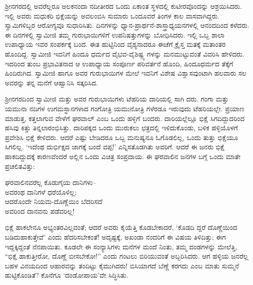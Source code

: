 ಶ್ರೀನಗರದಲ್ಲಿ ಅವರೆಲ್ಲರೂ ಅಲಕನಂದಾ ನದೀತೀರದ ಒಂದು ಏಕಾಂತ ಸ್ಥಳದಲ್ಲಿ ಕುಟೀರವೊಂದನ್ನು ಆಶ್ರಯಿಸಿದರು. ಇಲ್ಲಿ ಅವರು ಮಧುಕರಿ ಭಿಕ್ಷೆಯನ್ನು ಅವಲಂಬಿಸಿ ಸುಮಾರು ಒಂದೂವರೆ ತಿಂಗಳ ಕಾಲ ವಾಸವಾಗಿದ್ದರು. ಸ್ವಾಮಿಗಳಿಬ್ಬರ ಆರೋಗ್ಯವೂ ಸುಧಾರಿಸಿತು. ದಿನಗಳನ್ನು ಧ್ಯಾನ-ಪ್ರಾರ್ಥನೆ-ಶಾಸ್ತ್ರಾಧ್ಯಯನಗಳಲ್ಲಿ ಆನಂದದಿಂದ ಕಳೆದರು. ಈ ದಿನಗಳಲ್ಲಿ ಸ್ವಾಮೀಜಿ ತಮ್ಮ ಗುರುಭಾಯಿಗಳಿಗೆ ಉಪನಿಷತ್ತುಗಳನ್ನು ಬೋಧಿಸಿದರು. ಇಲ್ಲಿ ಒಬ್ಬ ಶಾಲಾ ಉಪಾಧ್ಯಾಯ ಇವರ ಸಂಪರ್ಕಕ್ಕೆ ಬಂದ. ಈತ ಹುಟ್ಟಿನಿಂದ ವೈಶ್ಯನಾದರೂ ಈಚೆಗೆ ಕ್ರೈಸ್ತ ಮತಕ್ಕೆ ಮತಾಂತರ ಹೊಂದಿದ್ದ. ಸ್ವಾಮೀಜಿ ಇವನಿಗೆ ಹಿಂದೂ ಧರ್ಮದ ವೈಭವ-ವೈಶಿಷ್ಟ್ಯ ಗಳನ್ನು ಮನಮುಟ್ಟುವಂತೆ ವಿವರಿಸಿ ಹೇಳಿದರು. ಇದರಿಂದ ತುಂಬ ಪ್ರಭಾವಿತನಾದ ಆ ಉಪಾಧ್ಯಾಯ ಸಂಪೂರ್ಣ ಪರಿವರ್ತನೆ ಹೊಂದಿ, ಹಿಂದೂಧರ್ಮದ ತೆಕ್ಕೆಗೆ ಹಿಂದಿರುಗಿದ. ಸ್ವಾಮೀಜಿ ಹಾಗೂ ಅವರ ಗುರುಭಾಯಿಗಳ ಮೇಲೆ ಇವನಿಗೆ ವಿಶೇಷ ವಿಶ್ವಾಸವುಂಟಾಗಿ ಹಲವಾರು ಸಲ ಅವರನ್ನು ತನ್ನ ಮನೆಗೆ ಆಹ್ವಾನಿಸಿ ಸತ್ಕರಿಸಿದ.

ಶ್ರೀನಗರದಿಂದ ಸ್ವಾಮೀಜಿ ಮತ್ತು ಅವರ ಗುರುಭಾಯಿಗಳು ಟೆಹರಿಯ ದಾರಿಯಲ್ಲಿ ಸಾಗಿ ದರು. ಗಂಗಾ ಮತ್ತು ಯಮುನಾ ನದಿಗಳ ಉಗಮಸ್ಥಾನಗಳಾದ ಗಂಗೋತ್ರಿ ಯಮುನೋತ್ರಿ ಗಳೆರಡೂ ಇರುವುದು ಟೆಹರಿಯಲ್ಲೇ. ಪ್ರಯಾಣ ಮಾಡುತ್ತ, ಕತ್ತಲಾಗುವ ವೇಳೆಗೆ ಘರವಾಲ್ ಎಂಬ ಒಂದು ಹಳ್ಳಿಗೆ ಬಂದರು. ದಾರಿಯಲ್ಲೆಲ್ಲೂ ಭಿಕ್ಷೆ ಸಿಗದಿದ್ದುದರಿಂದ ಹಸಿವು ಕಿತ್ತು ತಿನ್ನಲಾರಂಭಿಸಿತ್ತು. ದಾರಿಪಕ್ಕದ ಒಂದು ಮುರುಕಲು ಛತ್ರದಲ್ಲಿ ಇಳಿದುಕೊಂಡು, ಬಳಿಕ ಹಳ್ಳಿಯೊಳಗೆ ಪ್ರವೇಶಿಸಿ ಭಿಕ್ಷೆ ಕೇಳಿದರು. ಆದರೆ ಎಷ್ಟು ಬೇಡಿದರೂ ಒಬ್ಬ ಮನುಷ್ಯನೂ ಓಗೊಡಲಿಲ್ಲ, ಒಂದು ತುತ್ತು ಭಿಕ್ಷೆಯೂ ಸಿಗಲಿಲ್ಲ. ‘ಇದೆಂಥ ದುರ್ಭಿಕ್ಷದ ಜಾಗಕ್ಕೆ ಬಂದೆ ವಪ್ಪ!’ ಎನ್ನಿಸತೊಡಗಿತು ಅವರಿಗೆ. ಆದರೆ ಈ ಜನರು ಭಿಕ್ಷೆ ಹಾಕದಿದ್ದುದಕ್ಕೆ ಕಾರಣವೆಂದರೆ ಅಲ್ಲಿನ ಒಂದು ವಿಚಿತ್ರ ಸಂಪ್ರದಾಯ. ಈ ಘರವಾಲಿನ ಜನಗಳ ಬಗ್ಗೆ ಒಂದು ಮಾತೇ ಪ್ರಚಲಿತವಿತ್ತು:

\begin{myquote}
ಘರವಾಲಿನವರೆಲ್ಲ ಕೊಡುಗೈಯ ದಾನಿಗಳು–\\ಅವರಂಥ ದಾನಿಗಳೆ ಧರೆಯೊಳಿಲ್ಲ;\\ಆದರೊಂದೇ ನಿಯಮ-ದೊಣ್ಣೆಯಿಂ ಬೆದರಿಸದೆ\\ಅವರಿಂದ ದಾನವನು ಪಡೆವರಿಲ್ಲ!
\end{myquote}

\noindent

ಭಿಕ್ಷೆ ಹಾಕಲೇನೂ ಅಭ್ಯಂತರವಿಲ್ಲವಂತೆ; ಆದರೆ ಅವರು ಕೈಯೆತ್ತಿ ಕೊಡಬೇಕಾದರೆ, ‘ಕೊಡದಿ ದ್ದರೆ ದೊಣ್ಣೆಯಿಂದ ಬಡಿದುಹಾಕುತ್ತೇವೆ’ ಎಂದು ಹೆದರಿಸಬೇಕಂತೆ! ಅದೃಷ್ಟಕ್ಕೆ, ಅಖಂಡಾ ನಂದರಿಗೆ ಈ ವಿಷಯ ತಿಳಿದಿತ್ತು; ಈಗ ಇದ್ದಕ್ಕಿದ್ದಂತೆ ನೆನಪಾಯಿತು. ಕೂಡಲೇ ಈ ಸಂನ್ಯಾಸಿಗಳು ಮನೆಗಳ ಮಂದೆ ನಿಂತು, ತಮ್ಮ ದಂಡಗಳನ್ನು ಮೇಲೆತ್ತಿ, “ಭಿಕ್ಷೆ ಹಾಕುತ್ತೀರೋ, ದೊಣ್ಣೆ ಬೀಸಬೇಕೋ!” ಎಂದು ಗಂಟಲು ಬಿರಿಯುವಂತೆ ಅಬ್ಬರಿಸಿದರು. ಆಗ ಹಳ್ಳಿಯ ಜನರೆಲ್ಲ ಬಹಳ ವಿನಯದಿಂದ ಆಹಾರವನ್ನು ತಂದಿಟ್ಟು ಕೈಮುಗಿದರು! ಬಿಸಿಯಾಗದೆ ಬೆಣ್ಣೆ ಕರಗದು ಎಂಬ ಮಾತು ಸುಮ್ಮನೆ ಹುಟ್ಟಿಕೊಂಡಿತೆ? ಕೊನೆಗೂ ‘ದಂಡೋಪಾಯ’ವೇ ಸಿದ್ಧಿಸಿತು.

